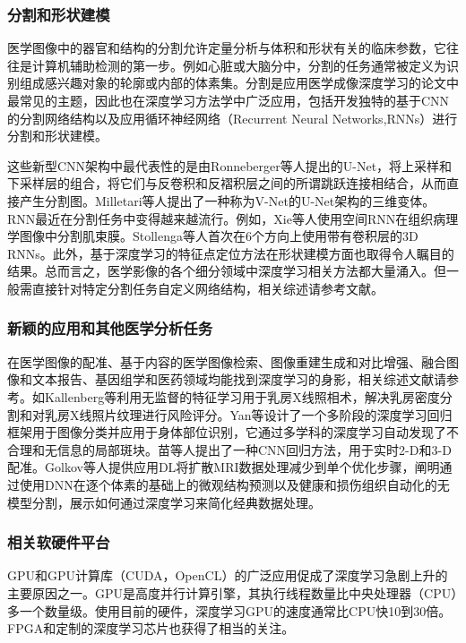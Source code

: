 \subsubsection{分割和形状建模}

医学图像中的器官和结构的分割允许定量分析与体积和形状有关的临床参数，它往往是计算机辅助检测的第一步。例如心脏或大脑分中，分割的任务通常被定义为识别组成感兴趣对象的轮廓或内部的体素集。分割是应用医学成像深度学习的论文中最常见的主题，因此也在深度学习方法学中广泛应用，包括开发独特的基于CNN的分割网络结构以及应用循环神经网络（Recurrent Neural Networks,RNNs）进行分割和形状建模。

这些新型CNN架构中最代表性的是由Ronneberger等人\citep{Ronneberger2015}提出的U-Net，将上采样和下采样层的组合，将它们与反卷积和反褶积层之间的所谓跳跃连接相结合，从而直接产生分割图。Milletari等人\citep{Milletari2016}提出了一种称为V-Net的U-Net架构的三维变体。RNN最近在分割任务中变得越来越流行。例如，Xie等人\citep{xie2016}使用空间RNN在组织病理学图像中分割肌束膜。Stollenga等人\citep{cortes2015}首次在6个方向上使用带有卷积层的3D RNNs。此外，基于深度学习的特征点定位方法\citep{Trigeorgis2016}在形状建模方面也取得令人瞩目的结果。总而言之，医学影像的各个细分领域中深度学习相关方法都大量涌入。但一般需直接针对特定分割任务自定义网络结构，相关综述请参考文献。

\subsubsection{新颖的应用和其他医学分析任务}
\label{sec:applications_various}

在医学图像的配准、基于内容的医学图像检索、图像重建生成和对比增强、融合图像和文本报告、基因组学和医药领域均能找到深度学习的身影，相关综述文献请参考。如Kallenberg等\citep{Kallenberg2016Unsupervised}利用无监督的特征学习用于乳房X线照相术，解决乳房密度分割和对乳房X线照片纹理进行风险评分。Yan等\citep{Yan2016Multi}设计了一个多阶段的深度学习回归框架用于图像分类并应用于身体部位识别，它通过多学科的深度学习自动发现了不合理和无信息的局部斑块。苗等人\citep{Miao2016A}提出了一种CNN回归方法，用于实时2-D和3-D配准。Golkov等人\citep{Golkov2016q}提供应用DL将扩散MRI数据处理减少到单个优化步骤，阐明通过使用DNN在逐个体素的基础上的微观结构预测以及健康和损伤组织自动化的无模型分割，展示如何通过深度学习来简化经典数据处理。
\subsubsection{相关软硬件平台}
GPU和GPU计算库（CUDA，OpenCL）的广泛应用促成了深度学习急剧上升的主要原因之一。GPU是高度并行计算引擎，其执行线程数量比中央处理器（CPU）多一个数量级。使用目前的硬件，深度学习GPU的速度通常比CPU快10到30倍。FPGA和定制的深度学习芯片也获得了相当的关注。

